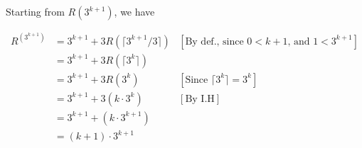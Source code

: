 \documentclass[12pt]{article}
\begin{document}
\begin{enumerate}[a.]
\begin{mdframed}
\begin{enumerate}[1.]
\begin{mdframed}
            Starting from $R(3^{k+1})$, we have

            \begin{align}
                R^(3^{k+1}) &= 3^{k+1} + 3R(\lceil 3^{k+1}/3 \rceil) & [\text{By def., since $0<k+1$, and $1<3^{k+1}$}]\\
                &= 3^{k+1} + 3R(\lceil 3^k \rceil)\\
                &= 3^{k+1} + 3R(3^k) & [\text{Since $\lceil 3^k \rceil = 3^k$}]\\
                &= 3^{k+1} + 3 (k \cdot 3^k) & [\text{By I.H}]\\
                &= 3^{k+1} + (k \cdot 3^{k+1})\\
                &= (k + 1) \cdot 3^{k+1}
            \end{align}

            \end{mdframed}
        \end{enumerate}
    \end{mdframed}
\end{enumerate}
\end{document}
